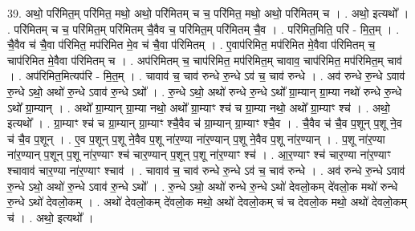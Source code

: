 \documentclass[17pt]{extarticle}
\begin{document}
39. अथो॒ परि॑मित॒म् परि॑मित॒ मथो॒ अथो॒ परि॑मितम् च च॒ परि॑मित॒ मथो॒ अथो॒ परि॑मितम् च । . अथो॒ इत्यथो᳚ । . परि॑मितम् च च॒ परि॑मित॒म् परि॑मितम् चै॒वैव च॒ परि॑मित॒म् परि॑मितम् चै॒व । . परि॑मित॒मिति॒ परि॑ - मि॒त॒म् । . चै॒वैव च॑ चै॒वा प॑रिमित॒ मप॑रिमित मे॒व च॑ चै॒वा प॑रिमितम् । . ए॒वाप॑रिमित॒ मप॑रिमित मे॒वैवा प॑रिमितम् च॒ चाप॑रिमित मे॒वैवा प॑रिमितम् च । . अप॑रिमितम् च॒ चाप॑रिमित॒ मप॑रिमित॒म् चावाव॒ चाप॑रिमित॒ मप॑रिमित॒म् चाव॑ । . अप॑रिमित॒मित्यप॑रि - मि॒त॒म् । . चावाव॑ च॒ चाव॑ रुन्धे रु॒न्धे ऽव॑ च॒ चाव॑ रुन्धे । . अव॑ रुन्धे रु॒न्धे ऽवाव॑ रु॒न्धे ऽथो॒ अथो॑ रु॒न्धे ऽवाव॑ रु॒न्धे ऽथो᳚ । . रु॒न्धे ऽथो॒ अथो॑ रुन्धे रु॒न्धे ऽथो᳚ ग्रा॒म्यान् ग्रा॒म्या नथो॑ रुन्धे रु॒न्धे ऽथो᳚ ग्रा॒म्यान् । . अथो᳚ ग्रा॒म्यान् ग्रा॒म्या नथो॒ अथो᳚ ग्रा॒म्याꣳ श्च॑ च ग्रा॒म्या नथो॒ अथो᳚ ग्रा॒म्याꣳ श्च॑ । . अथो॒ इत्यथो᳚ । . ग्रा॒म्याꣳ श्च॑ च ग्रा॒म्यान् ग्रा॒म्याꣳ श्चै॒वैव च॑ ग्रा॒म्यान् ग्रा॒म्याꣳ श्चै॒व । . चै॒वैव च॑ चै॒व प॒शून् प॒शू ने॒व च॑ चै॒व प॒शून् । . ए॒व प॒शून् प॒शू ने॒वैव प॒शू ना॑र॒ण्या ना॑र॒ण्यान् प॒शू ने॒वैव प॒शू ना॑र॒ण्यान् । . प॒शू ना॑र॒ण्या ना॑र॒ण्यान् प॒शून् प॒शू ना॑र॒ण्याꣳ श्च॑ चार॒ण्यान् प॒शून् प॒शू ना॑र॒ण्याꣳ श्च॑ । . आ॒र॒ण्याꣳ श्च॑ चार॒ण्या ना॑र॒ण्याꣳ श्चावाव॑ चार॒ण्या ना॑र॒ण्याꣳ श्चाव॑ । . चावाव॑ च॒ चाव॑ रुन्धे रु॒न्धे ऽव॑ च॒ चाव॑ रुन्धे । . अव॑ रुन्धे रु॒न्धे ऽवाव॑ रु॒न्धे ऽथो॒ अथो॑ रु॒न्धे ऽवाव॑ रु॒न्धे ऽथो᳚ । . रु॒न्धे ऽथो॒ अथो॑ रुन्धे रु॒न्धे ऽथो॑ देवलो॒कम् दे॑वलो॒क मथो॑ रुन्धे रु॒न्धे ऽथो॑ देवलो॒कम् । . अथो॑ देवलो॒कम् दे॑वलो॒क मथो॒ अथो॑ देवलो॒कम् च॑ च देवलो॒क मथो॒ अथो॑ देवलो॒कम् च॑ । . अथो॒ इत्यथो᳚ । \newline
\pagebreak
{}
\end{document}
